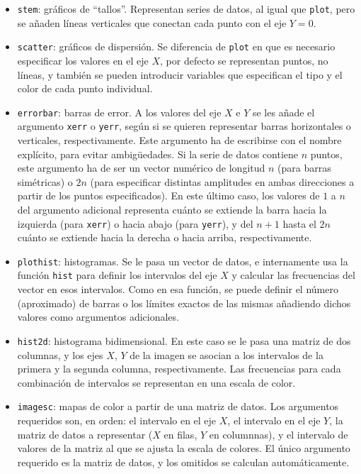 ﻿\documentclass{article}
\newcommand{\code}{\texttt}
\begin{document}
\begin{itemize}
  \item \code{stem}: gráficos de ``tallos''. Representan series de datos, al igual que \code{plot}, pero se añaden líneas verticales que conectan cada punto con el eje $Y=0$.
  \item \code{scatter}: gráficos de dispersión. Se diferencia de \code{plot} en que es necesario especificar los valores en el eje $X$, por defecto se representan puntos, no líneas, y también se pueden introducir variables que especifican el tipo y el color de cada punto individual.
  \item \code{errorbar}: barras de error. A los valores del eje $X$ e $Y$ se les añade el argumento \code{xerr} o \code{yerr}, según si se quieren representar barras horizontales o verticales, respectivamente. Este argumento ha de escribirse con el nombre explícito, para evitar ambigüedades. Si la serie de datos contiene $n$ puntos, este argumento ha de ser un vector numérico de longitud $n$ (para barras simétricas) o $2n$ (para especificar distintas amplitudes en ambas direcciones a partir de los puntos especificados). En este último caso, los valores de $1$ a $n$ del argumento adicional representa cuánto se extiende la barra hacia la izquierda (para \code{xerr}) o hacia abajo (para \code{yerr}), y del $n+1$ hasta el $2n$ cuánto se extiende hacia la derecha o hacia arriba, respectivamente.
  \item \code{plothist}: histogramas. Se le pasa un vector de datos, e internamente usa la función \code{hist} para definir los intervalos del eje $X$ y calcular las frecuencias del vector en esos intervalos. Como en esa función, se puede definir el número (aproximado) de barras o los límites exactos de las mismas añadiendo dichos valores como argumentos adicionales.
  \item\code{hist2d}: histograma bidimensional. En este caso se le pasa una matriz de dos columnas, y los ejes $X$, $Y$ de la imagen se asocian a los intervalos de la primera y la segunda columna, respectivamente. Las frecuencias para cada combinación de intervalos se representan en una escala de color.
  \item\code{imagesc}: mapas de color a partir de una matriz de datos. Los argumentos requeridos son, en orden: el intervalo en el eje $X$, el intervalo en el eje $Y$, la matriz de datos a representar ($X$ en filas, $Y$ en columnnas), y el intervalo de valores de la matriz al que se ajusta la escala de colores. El único argumento requerido es la matriz de datos, y los omitidos se calculan automáticamente.
\end{itemize}
\end{document}
